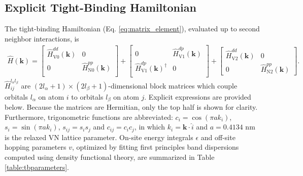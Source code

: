 \documentclass[twocolumn,showpacs,preprintnumbers,superscriptaddress,prb,floatfix,aps,10pt]{revtex4-1}
\renewcommand{\vec}[1]{\ensuremath{\mathbf{#1}}}
\newcommand*{\ham}{\hat{H}}
\begin{document}
\begin{widetext}

\section{Explicit Tight-Binding Hamiltonian}

The tight-binding Hamiltonian (Eq. \ref{eq:matrix_element}), evaluated up to second neighbor interactions, is
%
%
\begin{align}
\label{eq:ham_explicit}
\ham(\vec{k}) =
\begin{bmatrix}
\ham_{\textrm{V}0}^{dd}(\vec{k}) & 0 \\
0 & \ham_{\textrm{N}0}^{pp}(\vec{k})\\
\end{bmatrix}
+ 
\begin{bmatrix}
0 &\ham_{\textrm{V}1}^{dp}(\vec{k}) \\
\ham_{\textrm{V}1}^{dp}(\vec{k})^{\dagger} & 0 \\
\end{bmatrix}
+ 
\begin{bmatrix}
\ham_{\textrm{V}2}^{dd}(\vec{k}) & 0 \\
0 & \ham_{\textrm{N}2}^{pp}(\vec{k})
\end{bmatrix} .
\end{align}
%
%
$\ham_{ij}^{l_\alpha l_\beta}$ are $(2l_\alpha+1)\times(2l_\beta+1)$-dimensional block matrices which couple orbitals $l_\alpha$ on atom $i$ to orbitals $l_\beta$ on atom $j$. Explicit expressions are provided below.  Because the matrices are Hermitian, only the top half is shown for clarity. Furthermore, trigonometric functions are abbreviated: $c_i = \cos(\pi a k_i)$, $s_i = \sin(\pi a k_i)$, $s_{ij} = s_i s_j$ and $c_{ij} = c_i c_j$, in which $k_i = \vec{k}\cdot\hat{i}$ and $a = 0.4134$ nm is the relaxed VN lattice parameter. On-site energy integrals $\epsilon$ and off-site hopping parameters $v$, optimized by fitting first principles band dispersions computed using density functional theory, are summarized in Table \ref{table:tbparameters}.

%



\end{widetext}
\end{document}

